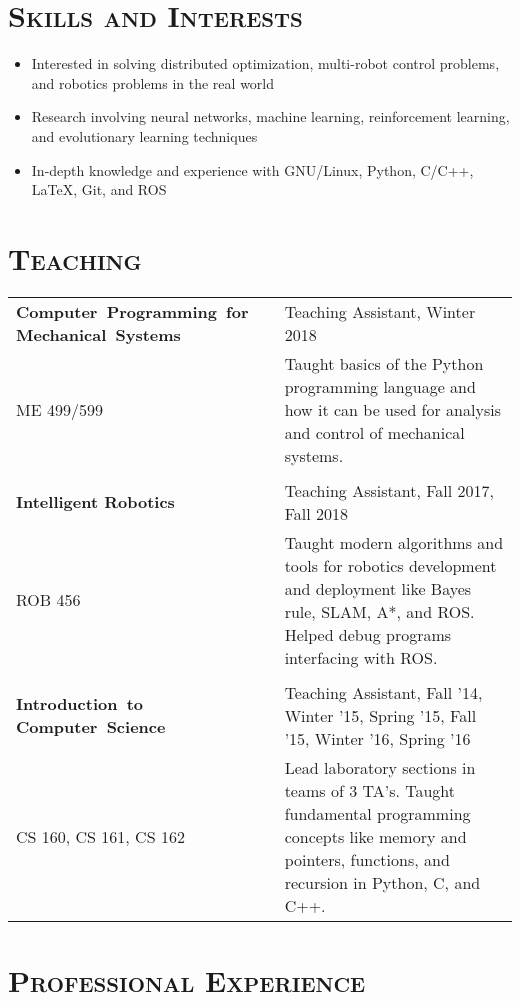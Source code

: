 \documentclass[letterpaper,10pt,titlepage]{article}
\newcommand{\leftW}{0.32\textwidth}
\begin{document}
\section*{\textsc{Skills and Interests}}
\begin{itemize} \itemsep1pt \parskip0pt 
\item Interested in solving distributed optimization, multi-robot control problems, and robotics problems in the real world
\item Research involving neural networks, machine learning, reinforcement learning, and evolutionary learning techniques
\item In-depth knowledge and experience with GNU/Linux, Python, C/C++, \LaTeX, Git, and ROS
\end{itemize}


\section*{\textsc{Teaching}}
\begin{tabularx}{\linewidth}{p{\leftW}X}
	\textbf{\mbox{Computer Programming for} \mbox{Mechanical Systems}} & Teaching Assistant, Winter 2018\\
	ME 499/599 & Taught basics of the Python programming language and how it can be used for analysis and control of mechanical systems. \\
	\\
	\textbf{Intelligent Robotics}&Teaching Assistant, Fall 2017, Fall 2018\\
	ROB 456 & Taught modern algorithms and tools for robotics development and deployment like Bayes rule, SLAM, A*, and ROS. Helped debug programs interfacing with ROS. \\
	\\
	\textbf{\mbox{Introduction to} \mbox{Computer Science}} & Teaching Assistant, Fall '14, Winter '15, Spring '15, Fall '15, Winter '16, Spring '16\\
	CS 160, CS 161, CS 162 &  Lead laboratory sections in teams of 3 TA's. Taught fundamental programming concepts like memory and pointers, functions, and recursion in Python, C, and C++.
\end{tabularx}


\section*{\textsc{Professional Experience}}
\end{document}
